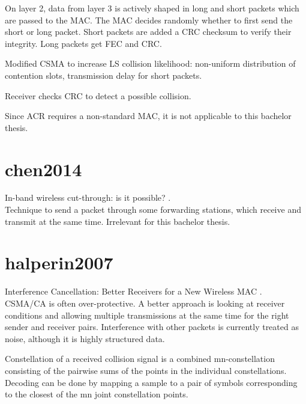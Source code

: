 On layer 2, data from layer 3 is actively shaped in long and short packets which are passed to the MAC. The MAC decides randomly whether to first send the short or long packet. Short packets are added a CRC checksum to verify their integrity. Long packets get FEC and CRC.

Modified CSMA to increase LS collision likelihood: non-uniform distribution of contention slots, transmission delay for short packets.

Receiver checks CRC to detect a possible collision.

Since ACR requires a non-standard MAC, it is not applicable to this bachelor thesis.



\section*{chen2014}

In-band wireless cut-through: is it possible? \cite{chen2014}.\\

Technique to send a packet through some forwarding stations, which receive and transmit at the same time. Irrelevant for this bachelor thesis.



\section*{halperin2007}

Interference Cancellation: Better Receivers for a New Wireless MAC \cite{halperin2007}.\\

CSMA/CA is often over-protective. A better approach is looking at receiver conditions and allowing multiple transmissions at the same time for the right sender and receiver pairs. Interference with other packets is currently treated as noise, although it is highly structured data.

Constellation of a received collision signal is a combined mn-constellation consisting of the pairwise sums of the points in the individual constellations. Decoding can be done by mapping a sample to a pair of symbols corresponding to the closest of the mn joint constellation points.



